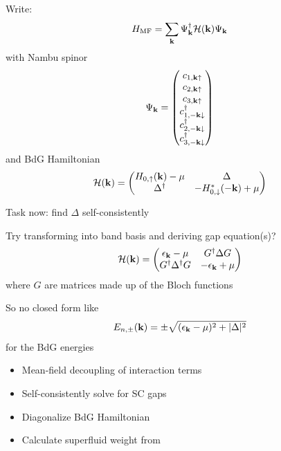 \documentclass[aspectratio=169]{beamer}
\begin{document}
\begin{frame}
	Write:
	\begin{equation}
		H_{\mathrm{MF}} = \sum_{\mathbf{k}} \Psi_{\mathbf{k}}^{\dagger} \mathcal{H} (\mathbf{k}) \Psi_{\mathbf{k}}
	\end{equation}
	with Nambu spinor
	\begin{equation}
		\Psi_{\mathbf{k}} =
		\begin{pmatrix}
			c_{1, \mathbf{k} \uparrow} \\
			c_{2, \mathbf{k} \uparrow} \\
			c_{3, \mathbf{k} \uparrow} \\
			c_{1, -\mathbf{k} \downarrow}^{\dagger} \\
			c_{2, -\mathbf{k} \downarrow}^{\dagger} \\
			c_{3, -\mathbf{k} \downarrow}^{\dagger} \\
		\end{pmatrix}
	\end{equation}
	and BdG Hamiltonian
	\begin{equation}
		\mathcal{H} (\mathbf{k}) =
		\begin{pmatrix}
			H_{0, \uparrow} (\mathbf{k}) - \mu & \Delta \\
			\Delta^{\dagger} & - H_{0, \downarrow}^* (-\mathbf{k}) + \mu
		\end{pmatrix}
	\end{equation}
\end{frame}

\begin{frame}
	Task now: find \(\Delta\) self-consistently
	
	Try transforming into band basis and deriving gap equation(s)?
	\begin{equation}
		\mathcal{H} (\mathbf{k}) =
		\begin{pmatrix}
			\epsilon_{\mathbf{k}} - \mu & G^{\dagger} \Delta G\\
			G^{\dagger} \Delta^{\dagger} G & -\epsilon_{\mathbf{k}} + \mu
		\end{pmatrix}
	\end{equation}
	where \(G\) are matrices made up of the Bloch functions
	
	So no closed form like
	\begin{equation}
		E_{n, \pm} (\mathbf{k}) = \pm \sqrt{(\epsilon_{\mathbf{k}} - \mu)^2 + \vert \Delta \vert^2}
	\end{equation}
	for the BdG energies
\end{frame}

\begin{frame}
	\begin{itemize}
		\item Mean-field decoupling of interaction terms
		\item Self-consistently solve for SC gaps
		\item Diagonalize BdG Hamiltonian
		\item Calculate superfluid weight from 
	\end{itemize}
\end{frame}
\end{document}
